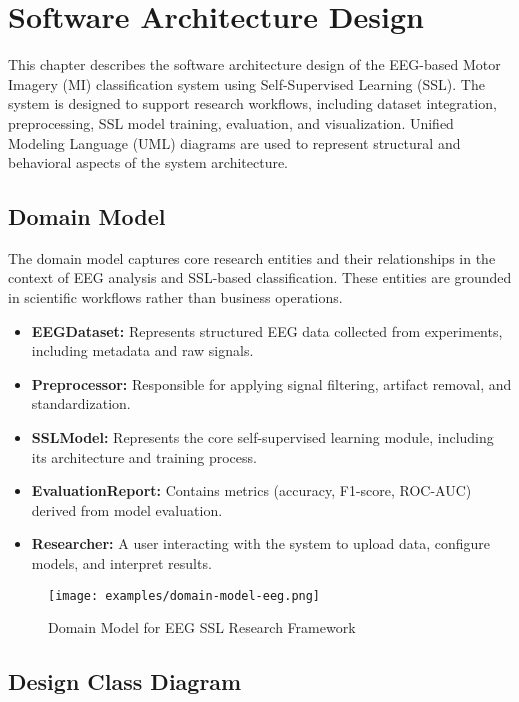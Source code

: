 \chapter{Software Architecture Design}
\label{chap:software-architecture-design}

This chapter describes the software architecture design of the EEG-based Motor Imagery (MI) classification system using Self-Supervised Learning (SSL). The system is designed to support research workflows, including dataset integration, preprocessing, SSL model training, evaluation, and visualization. Unified Modeling Language (UML) diagrams are used to represent structural and behavioral aspects of the system architecture.

\section{Domain Model}
\label{section:domain-model}

The domain model captures core research entities and their relationships in the context of EEG analysis and SSL-based classification. These entities are grounded in scientific workflows rather than business operations.

\begin{itemize}
    \item \textbf{EEGDataset:} Represents structured EEG data collected from experiments, including metadata and raw signals.
    \item \textbf{Preprocessor:} Responsible for applying signal filtering, artifact removal, and standardization.
    \item \textbf{SSLModel:} Represents the core self-supervised learning module, including its architecture and training process.
    \item \textbf{EvaluationReport:} Contains metrics (accuracy, F1-score, ROC-AUC) derived from model evaluation.
    \item \textbf{Researcher:} A user interacting with the system to upload data, configure models, and interpret results.
\end{itemize}

\begin{figure}[H]
    \centering
    \texttt{[image: examples/domain-model-eeg.png]}
    \caption{Domain Model for EEG SSL Research Framework}
\end{figure}

\section{Design Class Diagram}
\label{section:design-class-diagram}

